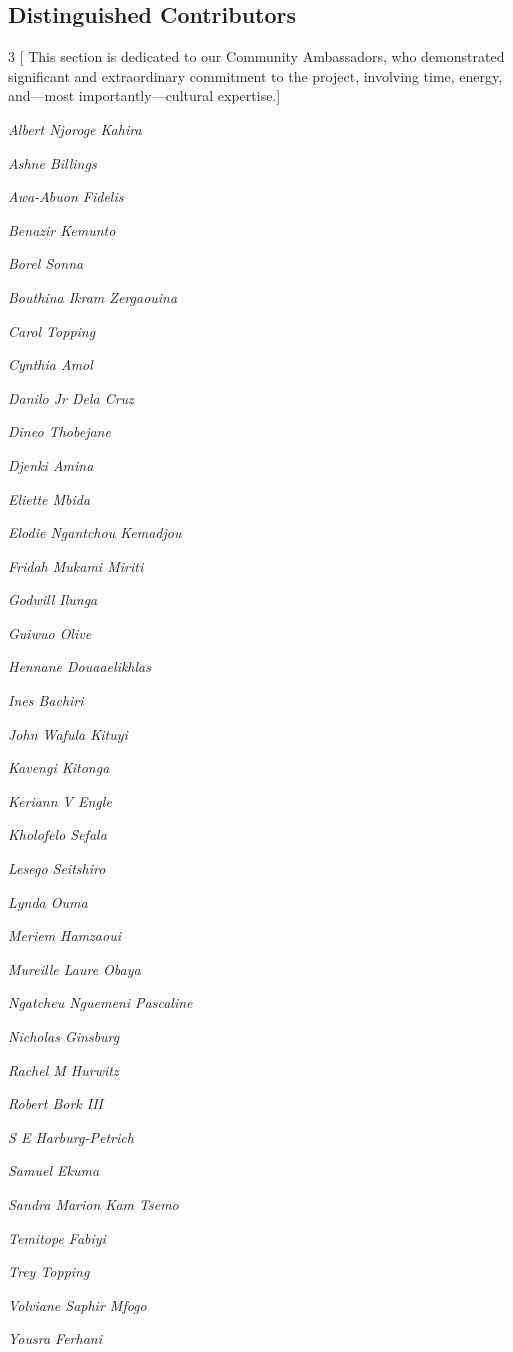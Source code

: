 \subsection{Distinguished Contributors} \label{dist_contributors}

\setlength{\columnsep}{0.5cm}
\begin{multicols}{3}
[
This section is dedicated to our Community Ambassadors, who demonstrated significant and extraordinary commitment to the project, involving time, energy, and—most importantly—cultural expertise.] 

\textit{Albert Njoroge Kahira}

\textit{Ashne Billings}

\textit{Awa-Abuon Fidelis}

\textit{Benazir Kemunto}

\textit{Borel Sonna}

\textit{Bouthina Ikram Zergaouina}

\textit{Carol Topping}

\textit{Cynthia Amol}

\textit{Danilo Jr Dela Cruz}

\textit{Dineo Thobejane}

\textit{Djenki Amina}

\textit{Eliette Mbida}

\textit{Elodie Ngantchou Kemadjou}

\textit{Fridah Mukami Miriti}

\textit{Godwill Ilunga}

\textit{Guiwuo Olive}

\textit{Hennane Douaaelikhlas}

\textit{Ines Bachiri}

\textit{John Wafula Kituyi}

\textit{Kavengi Kitonga}

\textit{Keriann V Engle}

\textit{Kholofelo Sefala}

\textit{Lesego Seitshiro}

\textit{Lynda Ouma}

\textit{Meriem Hamzaoui}

\textit{Mureille Laure Obaya}

\textit{Ngatcheu Nguemeni Pascaline}

\textit{Nicholas Ginsburg}

\textit{Rachel M Hurwitz}

\textit{Robert Bork III}

\textit{S E Harburg-Petrich}

\textit{Samuel Ekuma}

\textit{Sandra Marion Kam Tsemo}

\textit{Temitope Fabiyi}

\textit{Trey Topping}

\textit{Volviane Saphir Mfogo}

\textit{Yousra Ferhani}

\end{multicols}
